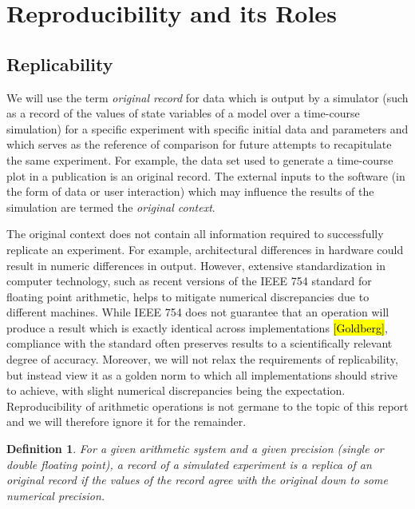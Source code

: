 \documentclass[journal,transmag]{IEEEtran}
\newtheorem{definition}{Definition}
\begin{document}
\section{Reproducibility and its Roles}

\subsection{Replicability}

We will use the term \textit{original record} for data which is output
by a simulator
(such as a record of the values of state variables of a model over a time-course simulation)
for a specific experiment with specific initial data and parameters
and which serves as the reference of comparison for future attempts
to recapitulate the same experiment.
For example, the data set used to generate a time-course plot in a publication
is an original record.
The external inputs to the software (in the form of data or user interaction)
which may influence the results of the simulation are termed the \textit{original context}.

The original context does not contain all information required to successfully replicate
an experiment. For example, architectural differences in hardware could result in numeric
differences in output. However, extensive standardization in computer technology, such as recent versions
of the IEEE 754 standard for floating point arithmetic, helps to mitigate numerical discrepancies
due to different machines. While IEEE 754 does not guarantee that an operation will produce
a result which is exactly identical across implementations \hl{[Goldberg]}, compliance with the standard often
preserves results to a scientifically relevant degree of accuracy.
Moreover, we will not relax the requirements of replicability, but instead view it as a
golden norm to which all implementations should strive to achieve, with slight
numerical discrepancies being the expectation.
Reproducibility of arithmetic operations is not germane to the topic of this report and
we will therefore ignore it for the remainder.


\begin{definition}
For a given arithmetic system and a given precision (single or double floating point),
a record of a simulated experiment is a \textit{replica} of an original record if
the values of the record agree with the original down to some numerical precision.
\end{definition}
\end{document}
